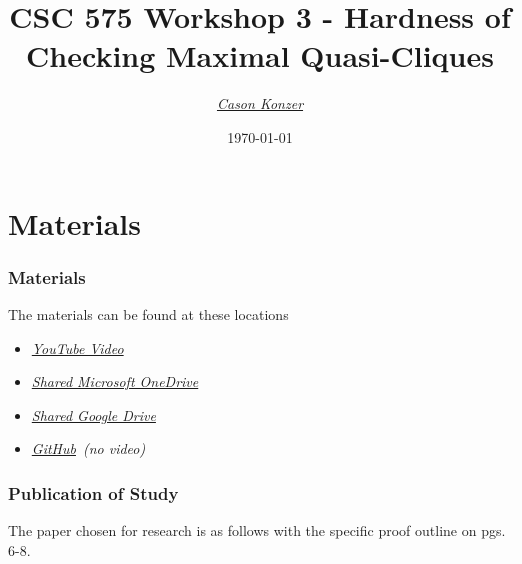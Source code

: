 \documentclass{beamer}
\title[Workshop 1]{CSC 575 Workshop 3 - Hardness of Checking Maximal Quasi-Cliques}
\author{\XV\textit{\large{\href{https://github.com/casonk}{Cason Konzer}}}\XB}
\institute[UM FLINT]{\normalsize{\textit{\href{mailto:casonk@umich.edu}{casonk@umich.edu}}}}
\date[]{\today}
\newcommand{\XB}{\color{black}}
\newcommand{\XV}{\color{violet}}
\begin{document}
\begin{frame}
    \titlepage
\end{frame}




\section{Materials}

\begin{frame}

    \frametitle{Materials}

    The materials can be found at these locations 

    \vspace{2.5mm}
    \begin{itemize}
        \item \XV\textit{\large{\href{https://youtu.be/GZLSmGtB7Gg}{YouTube Video}}}\XB
        \item \XV\textit{\large{\href{https://umich-my.sharepoint.com/:f:/g/personal/casonk_umich_edu/EowkLIGd-RVGsobVXZtum0MBk25G4taRHPlRAHKnd5MKUQ?e=8J49hs}{Shared Microsoft OneDrive}}}\XB
        \item \XV\textit{\large{\href{https://drive.google.com/drive/folders/1DDmc5UmoVXOOu7jOyl1UgvuIHD99sH2t?usp=sharing}{Shared Google Drive}}}\XB
        \item \XV\textit{\large{\href{https://github.com/casonk/CSC575-Algorithm_and_Complexity_Analysis/tree/main/WorkShop/WorkShop3}{GitHub}}}\XB \ \emph{(no video)}
    \end{itemize}

\end{frame}

\begin{frame}

  \frametitle{Publication of Study}

  The paper chosen for research is as follows with the specific proof outline on pgs. 6-8.
  \vspace{2.5mm}

  \cite{Mehri}
  {}
  
\end{frame}
\end{document}
